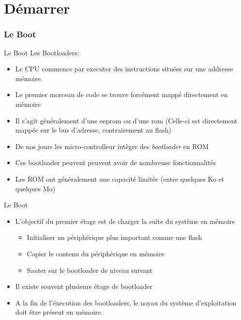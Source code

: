 %
%

\part{Démarrer}

\begin{frame}
  \partpage
\end{frame}

\begin{frame}
  \tableofcontents
\end{frame}

\section{Le Boot}

\begin{frame}[fragile=singleslide]{Le Boot}
  Les Bootloaders:
  \begin{itemize}
  \item Le CPU commence par  executer des instructions situées sur une
    addresse mémoire.
  \item  Le  premier  morceau  de  code se  trouve  forcément  mappé
    directement en mémoire
  \item Il  s'agit généralement d'une eeprom ou  d'une rom (Celle-ci
    est directement  mappée sur  le bus d'adresse,  contrairement au
    flash)
  \item   De    nos   jours   les    micro-controlleur   intègre   des
    \emph{bootloader} en ROM
  \item   Ces   bootloader   peuvent   peuvent  avoir   de   nombreuse
    fonctionnalités
  \item Les ROM ont  généralement une capacité limitée (entre quelques
    Ko et quelques Mo)
  \end{itemize}
\end{frame}

\begin{frame}[fragile=singleslide]{Le Boot}
  \begin{itemize} 
  \item L'objectif du premier étage est de charger la suite du système
    en mémoire
    \begin{itemize}
    \item Initialiser un périphérique plus important comme une flash
    \item Copier le contenu du périphérique en mémoire
    \item Sauter sur le bootloader de niveau suivant
    \end{itemize}
  \item Il existe souvent plusieurs étage de bootloader
  \item A la  fin de l'éxecution des bootloaders,  le noyau du système
    d'exploitation doit être présent en mémoire.
  \end{itemize}
\end{frame}

